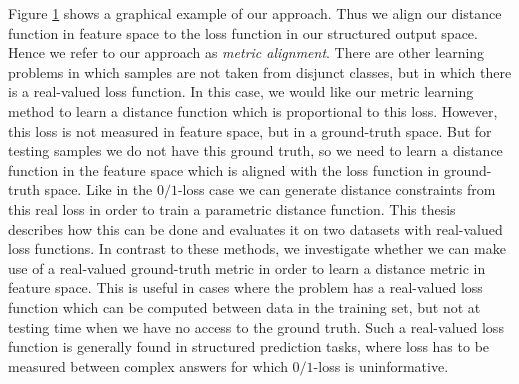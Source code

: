 \begin{figure}[t]
\begin{center}
\caption{}
\label{fig:approach_overview}
\end{center}
\end{figure}

Figure \ref{fig:approach_overview} shows a graphical example of our approach.
Thus we align our distance function in feature space to the loss function in our structured output space. Hence we refer to our approach as \emph{metric alignment}.
There are other learning problems in which samples are not taken from disjunct classes, but in which there is a real-valued loss function. In this case, we would like our metric learning method to learn a distance function which is proportional to this loss. However, this loss is not measured in feature space, but in a ground-truth space. But for testing samples we do not have this ground truth, so we need to learn a distance function in the feature space which is aligned with the loss function in ground-truth space. Like in the $0/1$-loss case we can generate distance constraints from this real loss in order to train a parametric distance function. This thesis describes how this can be done and evaluates it on two datasets with real-valued loss functions.
 In contrast to these methods, we investigate whether we can make use of a real-valued ground-truth metric in order to learn a distance metric in feature space. This is useful in cases where the problem has a real-valued loss function which can be computed between data in the training set, but not at testing time when we have no access to the ground truth. Such a real-valued loss function is generally found in structured prediction tasks, where loss has to be measured between complex answers for which $0/1$-loss is uninformative.


